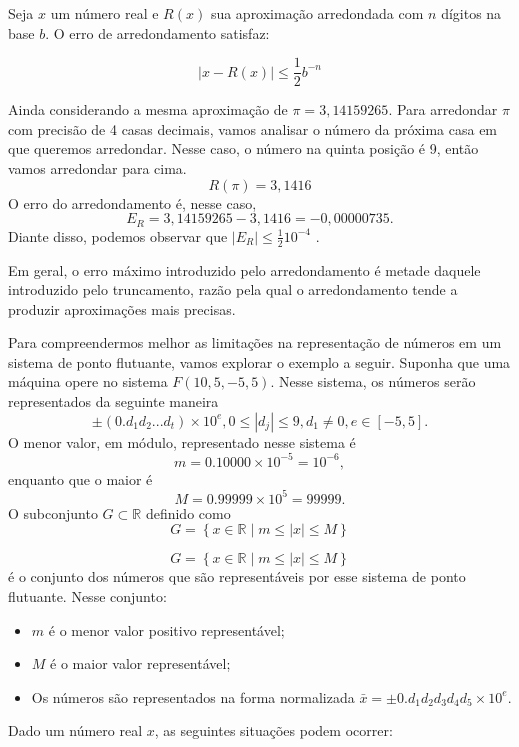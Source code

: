 Seja \( x \) um número real e \( R(x) \) sua aproximação arredondada com \( n \) dígitos na base \( b \). O erro de arredondamento satisfaz:

\[
|x - R(x)| \leq \frac{1}{2} b^{-n}
\]

\begin{ex}
Ainda considerando a mesma aproximação de \(\pi = 3,14159265\).
Para arredondar $\pi$  com precisão de 4 casas decimais, vamos analisar o número da próxima casa em que queremos arredondar. Nesse caso, o número na quinta posição é 9, então vamos arredondar para cima. 
$$R(\pi) = 3,1416$$
O erro do arredondamento é, nesse caso, $$E_R = 3,14159265 - 3,1416  = -0,00000735.$$  
Diante disso, podemos observar que $|E_R| \leq  \frac{ 1}{2}10^{-4}$ . %
\end{ex}

Em geral, o erro máximo introduzido pelo arredondamento é metade daquele introduzido pelo truncamento, razão pela qual o arredondamento tende a produzir aproximações mais precisas.




Para compreendermos melhor as limitações na representação de números em um sistema de ponto flutuante, vamos explorar o exemplo a seguir. Suponha que uma máquina opere no sistema $F(10, 5, -5, 5)$. %
Nesse sistema, os números serão representados da seguinte maneira
\begin{equation}
\pm (0.d_{1}d_{2} . . . d_{t}) \times 10^e,  0 \leq |d_{j}| \leq 9,  d_{1} \neq 0, e \in [-5,5].
\end{equation}
O menor valor, em módulo, representado nesse sistema é
$$
m = 0.10000 \times 10^{-5} = 10^{-6},
$$
enquanto que o maior é
$$
M = 0.99999 \times 10^{5} = 99999.
$$
O subconjunto $G \subset \mathbb{R}$ definido como
$$
G = \left\{ x \in \mathbb{R} \mid m \leq |x| \leq M \right\}
$$

\[
G = \left\{ x \in \mathbb{R} \mid m \leq |x| \leq M \right\}
\]
é o conjunto dos números que são representáveis por esse sistema de ponto flutuante. Nesse conjunto:
\begin{itemize}
  \item \( m \) é o menor valor positivo representável;
  \item \( M \) é o maior valor representável;
  \item Os números são representados na forma normalizada \( \bar{x} = \pm 0.d_1d_2d_3d_4d_5 \times 10^e \).
\end{itemize}
Dado um número real $x$, as seguintes situações podem ocorrer:

